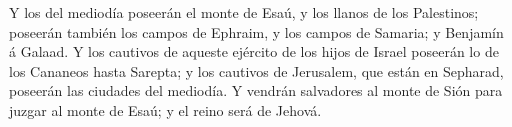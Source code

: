  Y los del mediodía poseerán el monte de Esaú, y los llanos
de los Palestinos; poseerán también los campos de Ephraim, y los campos
de Samaria; y Benjamín á Galaad.  Y los cautivos de aqueste
ejército de los hijos de Israel poseerán lo de los Cananeos hasta
Sarepta; y los cautivos de Jerusalem, que están en Sepharad, poseerán
las ciudades del mediodía.  Y vendrán salvadores al monte
de Sión para juzgar al monte de Esaú; y el reino será de Jehová.
